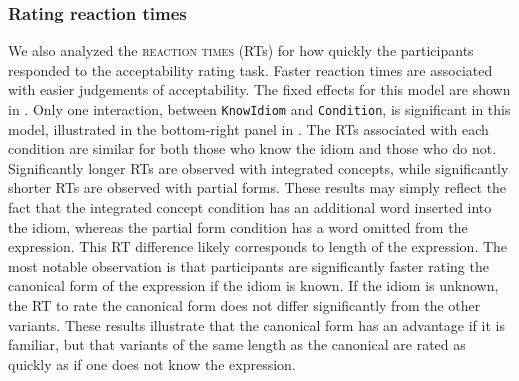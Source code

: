 \documentclass[output=paper
,modfonts
,nonflat]{langsci/langscibook}
\begin{document}
\subsubsection{Rating reaction times}

We also analyzed the \textsc{reaction times} (RTs) for how quickly the participants responded to the acceptability rating task. Faster reaction times are associated with easier judgements of acceptability. The fixed effects for this model are shown in . Only one interaction, between \texttt{KnowIdiom} and \texttt{Condition}, is significant in this model, illustrated in the bottom-right panel in . The RTs associated with each condition are similar for both those who know the idiom and those who do not. Significantly longer RTs are observed with integrated concepts, while significantly shorter RTs are observed with partial forms. These results may simply reflect the fact that the integrated concept  condition has an additional word inserted into the idiom, whereas the partial form condition has a word omitted from the expression. This RT difference likely corresponds to length of the expression. The most notable observation is that participants are significantly faster rating the canonical form of the expression if the idiom is known. If the idiom is unknown, the RT to rate the canonical form does not differ significantly from the other variants. These results illustrate that the canonical form has an advantage if it is familiar, but that variants of the same length as the canonical are rated as quickly as if one does not know the expression.\\ 
\end{document}
